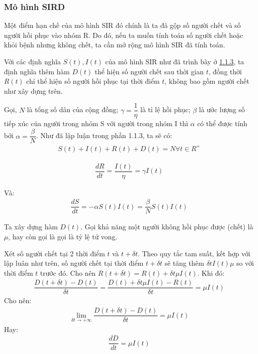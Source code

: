 \documentclass[a4paper]{article}
\begin{document}
\subsubsection{Mô hình SIRD}

Một điểm hạn chế của mô hình SIR đó chính là ta đã gộp số người chết và số người hồi phục vào nhóm R. Do đó, nếu ta muốn tính toán số người chết hoặc khỏi bệnh nhưng không chết, ta cần mở rộng mô hình SIR đã tính toán.

Với các định nghĩa $S(t), I(t)$ của mô hình SIR như đã trình bày ở \hyperref[sec: continuous SIR]{1.1.3}, ta định nghĩa thêm hàm $D(t)$ thể hiện số người chết sau thời gian $t$, đồng thời $R(t)$ chỉ thể hiện số người hồi phục tại thời điểm $t$, không bao gồm người chết như xây dựng trên.

Gọi, $N$ là tổng số dân của cộng đồng; $\gamma = \dfrac{1}{\eta}$ là tỉ lệ hồi phục; $\beta$ là ước lượng số tiếp xúc của người trong nhóm S với người trong nhóm I thì $\alpha$ có thể được tính bởi $\alpha = \dfrac{\beta}{N}$. Như đã lập luận trong phần 1.1.3, ta sẽ có: 
\begin{align*}
   S(t) + I(t) + R(t) + D(t) = N \forall t \in R^{+}
\end{align*}

\begin{align*}
    \dfrac{dR}{dt} = \dfrac{I(t)}{\eta} = \gamma I(t)
\end{align*}

Và: 
\begin{align*}
    \dfrac{dS}{dt} = -\alpha S(t)I(t) = \dfrac{\beta}{N} S(t)I(t)
\end{align*}

Ta xây dựng hàm $D(t)$. Gọi khả năng một người không hồi phục được (chết) là $\mu$, hay còn gọi là gọi là tỷ lệ tử vong.

Xét số người chết tại 2 thời điểm $t$ và $t +\delta t$. Theo quy tắc tam suất, kết hợp với lập luân như trên, số người chết tại thời điểm $t+ \delta t$ sẽ tăng thêm $\delta t I(t) \mu$ so với thời điểm $t$ trước đó. Cho nên $R(t+\delta t) = R(t) +\delta t \mu I(t) $. Khi đó:
\begin{align*}
    \dfrac{D(t + \delta t) - D(t)}{\delta t} = \dfrac {D(t) +\delta t \mu I(t) - R(t)}{\delta t} = \mu I(t)
\end{align*}
Cho nên:
\begin{align*}
    \lim_{\delta t\rightarrow +\infty} \dfrac{D(t + \delta t) - D(t)}{\delta t} = \mu I(t)
\end{align*}
Hay: 
\begin{align*}
    \dfrac{dD}{dt} = \mu I(t)
\end{align*}
\end{document}
